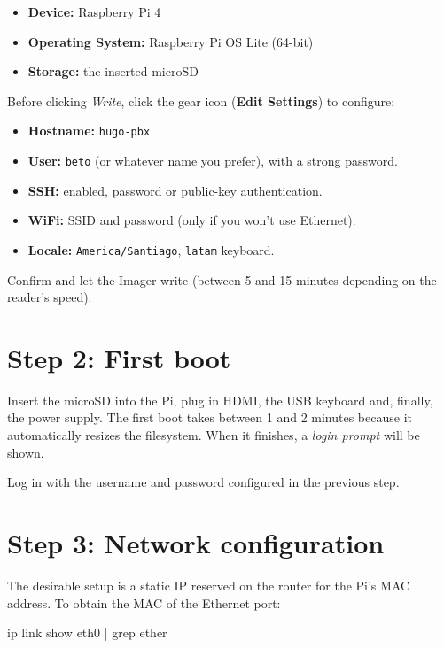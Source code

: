 \begin{itemize}
  \item \textbf{Device:} Raspberry Pi 4
  \item \textbf{Operating System:} Raspberry Pi OS Lite (64-bit)
  \item \textbf{Storage:} the inserted microSD
\end{itemize}

Before clicking \emph{Write}, click the gear icon (\textsf{\textbf{\textcolor{hugoblue}{Edit Settings}}}) to configure:

\begin{itemize}
  \item \textbf{Hostname:} \texttt{hugo-pbx}
  \item \textbf{User:} \texttt{beto} (or whatever name you prefer), with a strong password.
  \item \textbf{SSH:} enabled, password or public-key authentication.
  \item \textbf{WiFi:} SSID and password (only if you won't use Ethernet).
  \item \textbf{Locale:} \texttt{America/Santiago}, \texttt{latam} keyboard.
\end{itemize}

Confirm and let the Imager write (between 5 and 15 minutes depending on the reader's speed).

\section{Step 2: First boot}

Insert the microSD into the Pi, plug in HDMI, the USB keyboard and, finally, the power supply. The first boot takes between 1 and 2 minutes because it automatically resizes the filesystem. When it finishes, a \emph{login prompt} will be shown.

Log in with the username and password configured in the previous step.

\section{Step 3: Network configuration}

The desirable setup is a static IP reserved on the router for the Pi's MAC address. To obtain the MAC of the Ethernet port:

\begin{shellcode}
ip link show eth0 | grep ether
\end{shellcode}

